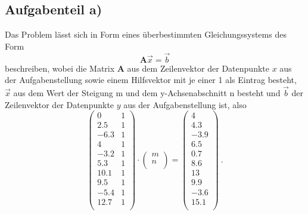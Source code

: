 \subsection*{Aufgabenteil a)}
Das Problem lässt sich in Form eines überbestimmten Gleichungssystems des Form
\begin{equation}
  \symbf{A}\vec{x}=\vec{b}
  \label{eqn:Lgs}
\end{equation}
beschreiben, wobei die Matrix $\symbf{A}$ aus dem Zeilenvektor der Datenpunkte $x$ aus der Aufgabenstellung sowie einem
Hilfsvektor mit je einer 1 als Eintrag besteht, $\vec{x}$ aus dem Wert der Steigung m und dem y-Achsenabschnitt
n besteht und $\vec{b}$ der Zeilenvektor der Datenpunkte $y$ aus der Aufgabenstellung ist, also
\begin{equation}
  \begin{pmatrix}
    0 & 1 \\
    2.5 & 1 \\
    -6.3 & 1 \\
    4 & 1 \\
    -3.2 & 1 \\
    5.3 & 1 \\
    10.1 & 1 \\
    9.5 & 1 \\
    -5.4 & 1 \\
    12.7 & 1 \\
  \end{pmatrix}
  \cdot
  \begin{pmatrix}
    m \\
    n \\
  \end{pmatrix}
  =
  \begin{pmatrix}
    4 \\
    4.3 \\
    -3.9 \\
    6.5 \\
    0.7 \\
    8.6 \\
    13 \\
    9.9 \\
    -3.6 \\
    15.1 \\
  \end{pmatrix} \: .
\end{equation}

